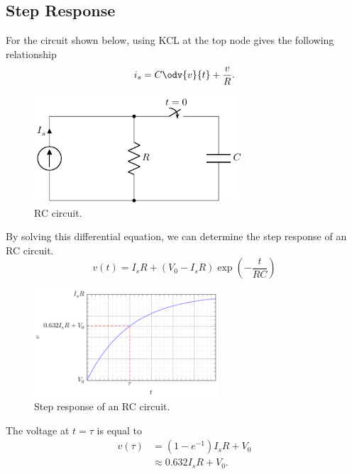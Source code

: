 \documentclass{article}
\begin{document}
\subsection{Step Response}
\begin{definition}
    For the circuit shown below, using KCL at the top node gives the following relationship
    \begin{equation*}
        i_s = C\odv{v}{t} + \frac{v}{R}.
    \end{equation*}
    \begin{figure}[H]
        \centering
        \includegraphics[height = 4cm, keepaspectratio = true]{figures/rc_step.pdf}
        \caption{RC circuit.}
    \end{figure}
    By solving this differential equation, we can determine the step response of an
    RC circuit.
    \begin{equation*}
        v(t) = I_s R + \left(V_0 - I_s R\right) \exp{\left( -\frac{t}{RC} \right)}
    \end{equation*}
    \begin{figure}[H]
        \centering
        \includegraphics[height = 4cm, keepaspectratio = true]{figures/rc_step_plot.pdf}
        \caption{Step response of an RC circuit.}
    \end{figure}
    The voltage at \(t = \tau\) is equal to
    \begin{align*}
        v(\tau) & = \left(1 - e^{-1}\right)I_s R + V_0 \\
                & \approx 0.632I_s R + V_0.
    \end{align*}
\end{definition}
\end{document}
